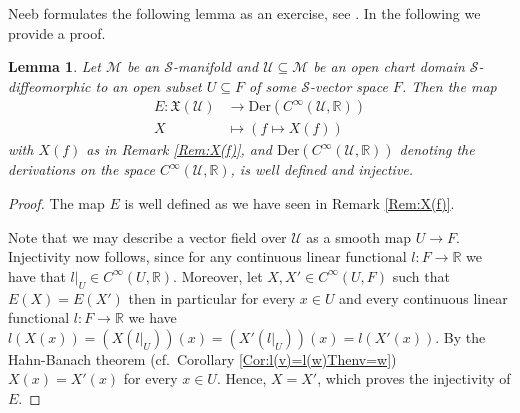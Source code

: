 \documentclass[12pt,a4paper]{article}
\theoremstyle{plain}
\newtheorem{lemma}[theorem]{Lemma}
\theoremstyle{definition}
\newcommand{\R}{\mathbb{R}}
\newcommand{\Mcal}{\mathcal{M}}
\newcommand{\Scal}{\mathcal{S}}
\newcommand{\Ucal}{\mathcal{U}}
\begin{document}
Neeb formulates the following lemma as an exercise, see \cite[Exercise II.17]{InfDimLieneeb}. In the following we provide a proof. 
\begin{lemma}
\label{Lemma:X.fInj}
Let $\Mcal$ be an $\Scal$-manifold and $\Ucal\subseteq \Mcal$ be an open chart domain $\Scal$-diffeomorphic to an open subset $U\subseteq F$ of some $\Scal$-vector space $F$. Then the map 
\begin{align*}
    E:\mathfrak{X}(\Ucal)&\longrightarrow \mathrm{Der}(C^\infty(\Ucal,\R))\\
    X&\longmapsto (f\mapsto X(f))
\end{align*}
with $X(f)$ as in Remark \ref{Rem:X(f)}, and $\mathrm{Der}(C^\infty(\Ucal,\R))$ denoting the derivations on the space $C^\infty(\Ucal,\R)$, is well defined and injective.
\end{lemma}
\begin{proof}
The map $E$ is well defined as we have seen in Remark \ref{Rem:X(f)}.

Note that we may describe a vector field over $\Ucal$ as a smooth map $U\to F$.
Injectivity now follows, since for any continuous linear functional $l:F\to \R$ we have that $\left.l\right|_U\in C^\infty(U,\R)$. Moreover, let $X,X'\in C^\infty(U,F)$ such that $E(X)=E(X')$ then in particular for every $x\in U$ and every continuous linear functional $l:F\to \R$ we have
$l(X(x))=(X(\left.l\right|_U))(x)=(X'(\left.l\right|_U))(x)=l(X'(x))$. By the Hahn-Banach theorem (cf.~Corollary \ref{Cor:l(v)=l(w)Thenv=w}) $X(x)=X'(x)$ for every $x\in U$. Hence, $X=X'$, which proves the injectivity of $E$.
\end{proof}
\end{document}
